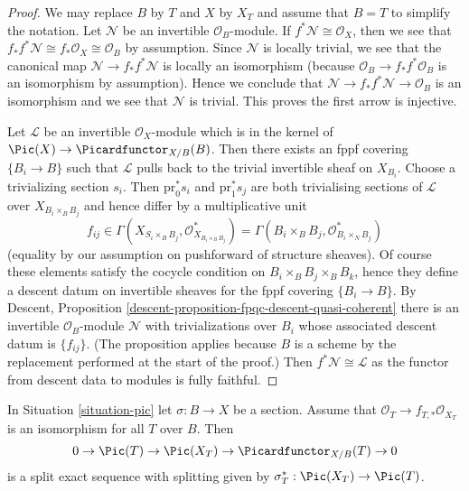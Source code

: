 \begin{proof}
We may replace $B$ by $T$ and $X$ by $X_T$ and assume that $B = T$
to simplify the notation. Let $\mathcal{N}$ be an invertible
$\mathcal{O}_B$-module. If $f^*\mathcal{N} \cong \mathcal{O}_X$, then
we see that $f_*f^*\mathcal{N} \cong f_*\mathcal{O}_X \cong \mathcal{O}_B$
by assumption. Since $\mathcal{N}$ is locally trivial, we see that
the canonical map $\mathcal{N} \to f_*f^*\mathcal{N}$ is locally
an isomorphism (because $\mathcal{O}_B \to f_*f^*\mathcal{O}_B$
is an isomorphism by assumption). Hence we conclude that
$\mathcal{N} \to f_*f^*\mathcal{N} \to \mathcal{O}_B$ is an isomorphism
and we see that $\mathcal{N}$ is trivial. This proves the first arrow
is injective.

\medskip\noindent
Let $\mathcal{L}$ be an invertible $\mathcal{O}_X$-module which is in
the kernel of $\Pic(X) \to \Picardfunctor_{X/B}(B)$. Then there exists
an fppf covering $\{B_i \to B\}$ such that $\mathcal{L}$ pulls back
to the trivial invertible sheaf on $X_{B_i}$. Choose a trivializing
section $s_i$. Then $\text{pr}_0^*s_i$ and $\text{pr}_1^*s_j$ are both
trivialising sections of $\mathcal{L}$ over $X_{B_i \times_B B_j}$
and hence differ by a multiplicative unit
$$
f_{ij} \in
\Gamma(X_{S_i \times_B B_j}, \mathcal{O}_{X_{B_i \times_B B_j}}^*) =
\Gamma(B_i \times_B B_j, \mathcal{O}_{B_i \times_N B_j}^*)
$$
(equality by our assumption on pushforward of structure sheaves).
Of course these elements satisfy the cocycle condition on
$B_i \times_B B_j \times_B B_k$, hence they define a descent datum
on invertible sheaves for the fppf covering $\{B_i \to B\}$.
By Descent, Proposition \ref{descent-proposition-fpqc-descent-quasi-coherent}
there is an invertible $\mathcal{O}_B$-module $\mathcal{N}$
with trivializations over $B_i$ whose associated descent datum is
$\{f_{ij}\}$. (The proposition applies because $B$ is a scheme
by the replacement performed at the start of the proof.)
Then $f^*\mathcal{N} \cong \mathcal{L}$ as the
functor from descent data to modules is fully faithful.
\end{proof}

\begin{lemma}
\label{lemma-flat-geometrically-connected-fibres-with-section}
In Situation \ref{situation-pic} let $\sigma : B \to X$ be a section.
Assume that $\mathcal{O}_T \to f_{T, *}\mathcal{O}_{X_T}$ is an isomorphism
for all $T$ over $B$. Then
$$
0 \to \Pic(T) \to \Pic(X_T) \to \Picardfunctor_{X/B}(T) \to 0
$$
is a split exact sequence with splitting given by
$\sigma_T^* : \Pic(X_T) \to \Pic(T)$.
\end{lemma}

